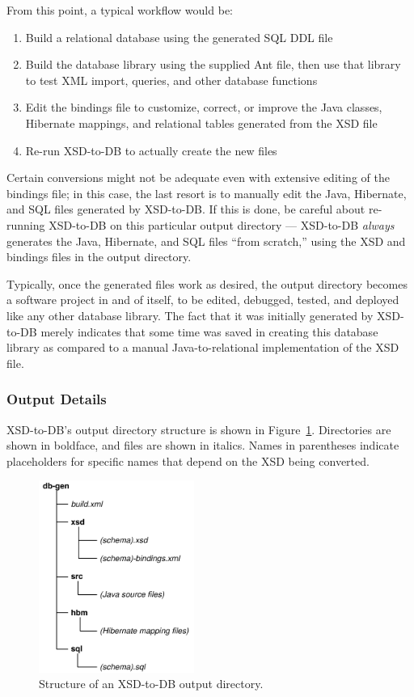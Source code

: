 \documentclass[11pt]{article}
\begin{document}
From this point, a typical workflow would be:
\begin{enumerate}
\item Build a relational database using the generated SQL DDL file
\item Build the database library using the supplied Ant file, then use that library to test XML import, queries, and other database functions
\item Edit the bindings file to customize, correct, or improve the Java classes, Hibernate mappings, and relational tables generated from the XSD file
\item Re-run XSD-to-DB to actually create the new files
\end{enumerate}
Certain conversions might not be adequate even with extensive editing of the bindings file; in this case, the last resort is to manually edit the Java, Hibernate, and SQL files generated by XSD-to-DB.  If this is done, be careful about re-running XSD-to-DB on this particular output directory --- XSD-to-DB \emph{always} generates the Java, Hibernate, and SQL files ``from scratch,'' using the XSD and bindings files in the output directory.

Typically, once the generated files work as desired, the output directory becomes a software project in and of itself, to be edited, debugged, tested, and deployed like any other database library.  The fact that it was initially generated by XSD-to-DB merely indicates that some time was saved in creating this database library as compared to a manual Java-to-relational implementation of the XSD file.

\subsubsection{Output Details}

XSD-to-DB's output directory structure is shown in Figure~\ref{output}.  Directories are shown in boldface, and files are shown in italics.  Names in parentheses indicate placeholders for specific names that depend on the XSD being converted.

\begin{figure}[htbp] %
   \centering
   \includegraphics[width=2in]{figures/db-gen.pdf} 
   \caption{Structure of an XSD-to-DB output directory.}
   \label{output}
\end{figure}
\end{document}

